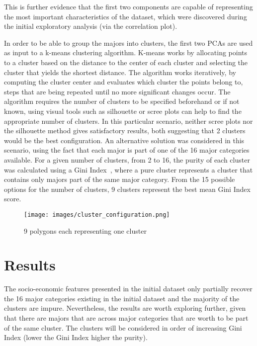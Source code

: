 \documentclass[11pt]{article}
\begin{document}
This is further evidence that the first two components are capable of representing the most important characteristics of the dataset, which were discovered during the initial exploratory analysis (via the correlation plot).

In order to be able to group the majors into clusters, the first two PCAs are used as input to a k-means clustering algorithm. K-means works by allocating points to a cluster based on the distance to the center of each cluster and selecting the cluster that yields the shortest distance. The algorithm works iteratively, by computing the cluster center and evaluates which cluster the points belong to, steps that are being repeated until no more significant changes occur. The algorithm requires the number of clusters to be specified beforehand or if not known, using visual tools such as silhouette or scree plots can help to find the appropriate number of clusters. In this particular scenario, neither scree plots nor the silhouette method gives satisfactory results, both suggesting that 2 clusters would be the best configuration. An alternative solution was considered in this scenario, using the fact that each major is part of one of the 16 major categories available. For a given number of clusters, from 2 to 16, the purity of each cluster was calculated using a Gini Index~\cite{giniindex}, where a pure cluster represents a cluster that contains only majors part of the same major category. From the 15 possible options for the number of clusters, 9 clusters represent the best mean Gini Index score.

\begin{figure} [H]
    \begin{center}
        \texttt{[image: images/cluster\_configuration.png]}
        \caption{9 polygons each representing one cluster}
        \label{fig:clusters}
    \end{center}
\end{figure}

\section*{Results} 

The socio-economic features presented in the initial dataset only partially recover the 16 major categories existing in the initial dataset and the majority of the clusters are impure. Nevertheless, the results are worth exploring further, given that there are majors that are across major categories that are worth to be part of the same cluster. The clusters will be considered in order of increasing Gini Index (lower the Gini Index higher the purity).
\end{document}
